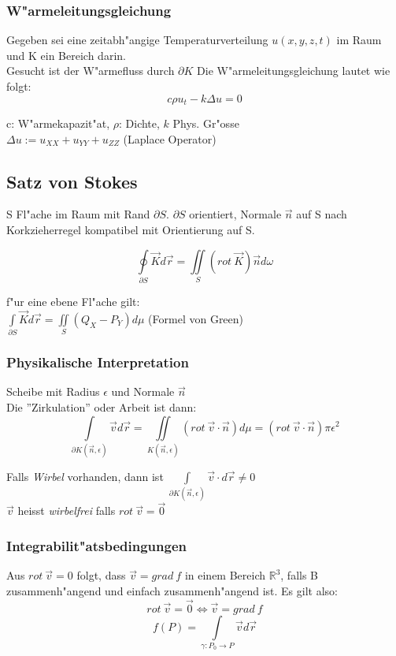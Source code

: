 \documentclass[10pt, a4paper, twocolumn]{scrartcl}
\begin{document}
\subsubsection{W"armeleitungsgleichung}

Gegeben sei eine zeitabh"angige Temperaturverteilung $u(x,y,z,t)$ im Raum und K ein Bereich darin.\\
Gesucht ist der W"armefluss durch $\partial K$
Die W"armeleitungsgleichung lautet wie folgt:
$$c\rho u_t- k\Delta u=0$$

c: W"armekapazit"at, $\rho$: Dichte, $k$ Phys. Gr"osse\\
$\Delta u:=u_{XX}+u_{YY}+u_{ZZ}$ (Laplace Operator)


\subsection{Satz von Stokes}

S Fl"ache im Raum mit Rand $\partial S$. $\partial S$ orientiert, Normale $\vec{n}$ auf S nach Korkzieherregel kompatibel mit Orientierung auf S.

$$\oint\limits_{\partial S}\vec{K}d\vec{r}=\iint\limits_S (rot\: \vec{K})\vec{n}d\omega$$

f"ur eine ebene Fl"ache gilt:\\
$\int\limits_{\partial S}\vec{K}d\vec{r}=\iint\limits_S (Q_X-P_Y)d\mu$ (Formel von Green)

\subsubsection{Physikalische Interpretation}

Scheibe mit Radius $\epsilon$ und Normale $\vec{n}$\\
Die ''Zirkulation'' oder Arbeit ist dann:
$$\int\limits_{\partial K(\vec{n},\epsilon)}\vec{v}d\vec{r}=\iint\limits_{K(\vec{n},\epsilon)}(rot\:\vec{v}\cdotp\vec{n})d\mu=(rot\:\vec{v}\cdotp\vec{n})\pi\epsilon^2$$

Falls \textit{Wirbel} vorhanden, dann ist $\int\limits_{\partial K(\vec{n},\epsilon)}\vec{v}\cdotp d\vec{r}\neq 0$\\
$\vec{v}$ heisst \textit{wirbelfrei} falls $rot\:\vec{v}=\vec{0}$

\subsubsection{Integrabilit"atsbedingungen}

Aus $rot\:\vec{v}=0$ folgt, dass $\vec{v}=grad\:f$ in einem Bereich $\mathbb{R}^3$, falls B zusammenh"angend und einfach zusammenh"angend ist. Es gilt also:
$$rot\:\vec{v}=\vec{0}\Leftrightarrow\vec{v}=grad\:f$$
$$f(P)=\int\limits_{\gamma:P_0\rightarrow P}\vec{v}d\vec{r}$$
\end{document}
